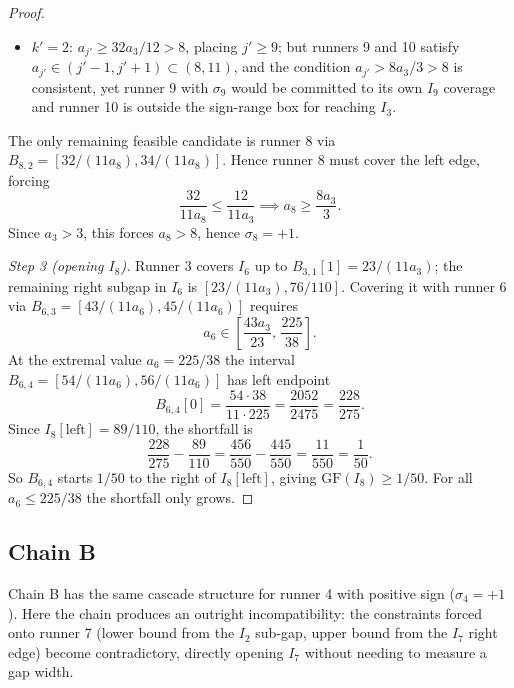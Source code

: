 \documentclass[12pt]{article}
\begin{document}
\begin{proof}
\begin{itemize}
\item $k'=2$: $a_{j'}\ge 32a_3/12>8$, placing $j'\ge 9$; but runners 9 and 10
satisfy $a_{j'}\in(j'-1,j'+1)\subset(8,11)$, and the condition $a_{j'}>8a_3/3>8$
is consistent, yet runner 9 with $\sigma_9$ would be committed to its own $I_9$
coverage and runner 10 is outside the sign-range box for reaching $I_3$.
\end{itemize}

The only remaining feasible candidate is runner 8 via $B_{8,2}=[32/(11a_8),34/(11a_8)]$.
Hence runner 8 must cover the left edge, forcing
\[
\frac{32}{11a_8} \le \frac{12}{11a_3} \implies a_8 \ge \frac{8a_3}{3}.
\]
Since $a_3>3$, this forces $a_8>8$, hence $\sigma_8=+1$.

\emph{Step 3 (opening $I_8$).} Runner 3 covers $I_6$ up to $B_{3,1}[1]=23/(11a_3)$;
the remaining right subgap in $I_6$ is $[23/(11a_3),76/110]$. Covering it with runner 6
via $B_{6,3}=[43/(11a_6),45/(11a_6)]$ requires
\[
a_6 \in \left[\frac{43a_3}{23},\,\frac{225}{38}\right].
\]
At the extremal value $a_6=225/38$ the interval $B_{6,4}=[54/(11a_6),56/(11a_6)]$ has
left endpoint
\[
B_{6,4}[0] = \frac{54\cdot 38}{11\cdot 225} = \frac{2052}{2475} = \frac{228}{275}.
\]
Since $I_8[\mathrm{left}]=89/110$, the shortfall is
\[
\frac{228}{275} - \frac{89}{110}
  = \frac{456}{550} - \frac{445}{550}
  = \frac{11}{550} = \frac{1}{50}.
\]
So $B_{6,4}$ starts $1/50$ to the right of $I_8[\mathrm{left}]$, giving
$\mathrm{GF}(I_8)\ge 1/50$. For all $a_6\le 225/38$ the shortfall only grows.
\end{proof}

\subsection{Chain B}

Chain B has the same cascade structure for runner 4 with positive sign ($\sigma_4=+1$). Here the chain
produces an outright incompatibility: the constraints forced onto runner 7 (lower bound
from the $I_2$ sub-gap, upper bound from the $I_7$ right edge) become contradictory,
directly opening $I_7$ without needing to measure a gap width.
\end{document}
